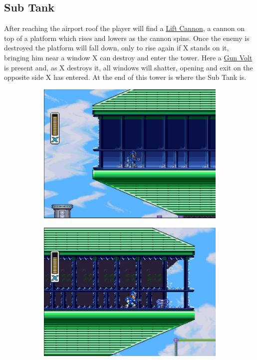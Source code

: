 \subsection{Sub Tank}
After reaching the airport roof the player will find a 	\hyperlink{enem:Lift_Cannon}{Lift Cannon}, a cannon on top of a platform which rises and lowers as the cannon spins. Once the enemy is destroyed the platform will fall down, only to rise again if X stands on it, bringing him near a window X can destroy and enter the tower. Here a \hyperlink{enem:Gun_Volt}{Gun Volt} is present and, as X destroys it, all windows will shatter, opening and exit on the opposite side X has entered. At the end of this tower is where the Sub Tank is. 

\begin{figure}[htp]
	\centering
	\begin{subfigure}{0.4\linewidth}
		\centering
		\includegraphics[width=\linewidth]{figures/X1/Storm_eagle/Storm_tank_1.jpg}
		\caption{}
	\end{subfigure}
	\begin{subfigure}{0.4\linewidth}
		\centering
		\includegraphics[width=\linewidth]{figures/X1/Storm_eagle/Storm_tank_2.jpg}

\end{subfigure}
\end{figure}
